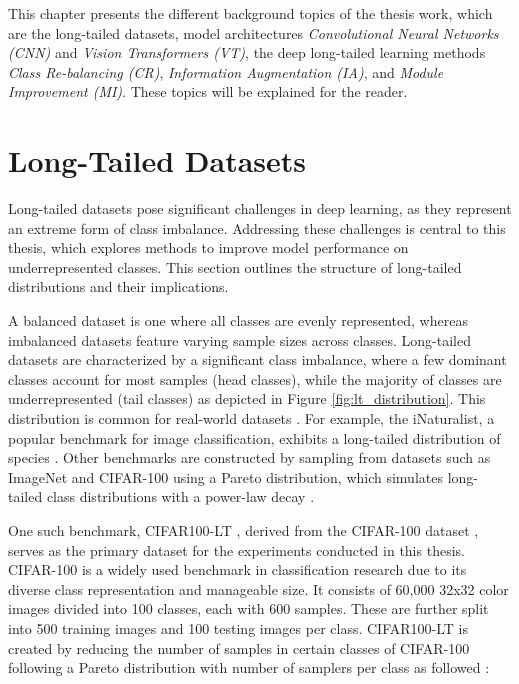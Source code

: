 

This chapter presents the different background topics of the thesis work, which are the long-tailed datasets, model architectures \textit{Convolutional Neural Networks (CNN)} and \textit{Vision Transformers (VT)}, the deep long-tailed learning methods \textit{Class Re-balancing (CR)}, \textit{Information Augmentation (IA)}, 
and \textit{Module Improvement (MI)}. These topics will be explained for the reader.



\section{Long-Tailed Datasets}
Long-tailed datasets pose significant challenges in deep learning, as they represent an extreme form of class imbalance. Addressing these challenges is central to this thesis, which explores methods to improve model performance on underrepresented classes. This section outlines the structure of long-tailed distributions and their implications.

A balanced dataset is one where all classes are evenly represented, whereas imbalanced datasets feature varying sample sizes across classes. Long-tailed datasets are characterized by a significant class imbalance, where a few dominant classes account for most samples (head classes), while the majority of classes are underrepresented (tail classes) as depicted in Figure \ref{fig:lt_distribution}. This  distribution is common for real-world datasets \cite{Newman_2005, liu2019largescalelongtailedrecognitionopen}. For example, the iNaturalist, a popular benchmark for image classification, exhibits a long-tailed distribution of species \cite{vanhorn2018inaturalistspeciesclassificationdetection}. Other benchmarks are constructed by sampling from datasets such as ImageNet \cite{ImageNet2009} and CIFAR-100 \cite{krizhevsky2009learning} using a Pareto distribution, which simulates long-tailed class distributions with a power-law decay \cite{zhang2023deep, dealvis2024surveydeeplongtailclassification,cao2019learningimbalanceddatasetslabeldistributionaware}.

One such benchmark, CIFAR100-LT \cite{cao2019learningimbalanceddatasetslabeldistributionaware}, derived from the CIFAR-100 dataset \cite{krizhevsky2009learning}, serves as the primary dataset for the experiments conducted in this thesis. CIFAR-100 is a widely used benchmark in classification research due to its diverse class representation and manageable size. It consists of 60,000 32x32 color images divided into 100 classes, each with 600 samples. These are further split into 500 training images and 100 testing images per class. CIFAR100-LT is created by reducing the number of samples in certain classes of CIFAR-100 following a Pareto distribution with number of samplers per class as followed \cite{kaidic_ldam_drw}:

